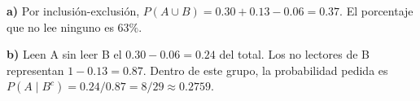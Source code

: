 \textbf{a)} Por inclusión-exclusión,
$P(A\cup B)=0.30+0.13-0.06=0.37$.
El porcentaje que no lee ninguno es $\boxed{63\%}$.

\textbf{b)} Leen A sin leer B el $0.30-0.06=0.24$ del total.
Los no lectores de B representan $1-0.13=0.87$.
Dentro de este grupo, la probabilidad pedida es
$P(A\mid B^c)=0.24/0.87=\boxed{8/29\approx0.2759}$.
